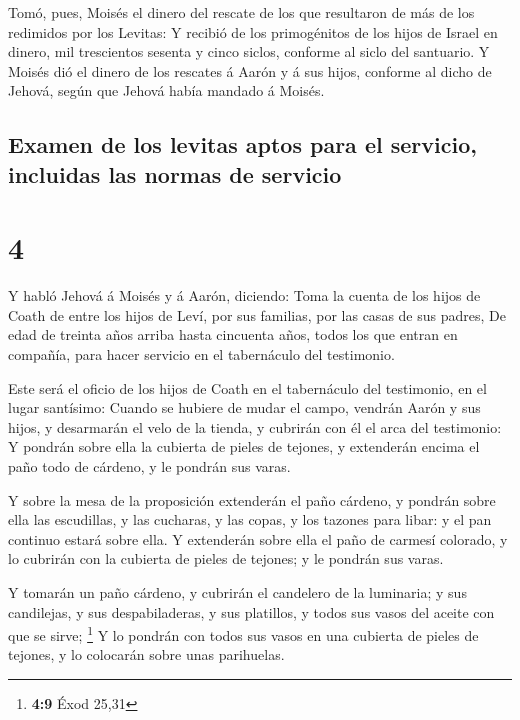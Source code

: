  Tomó, pues, Moisés el dinero del rescate de los que
resultaron de más de los redimidos por los Levitas:  Y
recibió de los primogénitos de los hijos de Israel en dinero, mil
trescientos sesenta y cinco siclos, conforme al siclo del santuario.
 Y Moisés dió el dinero de los rescates á Aarón y á sus
hijos, conforme al dicho de Jehová, según que Jehová había mandado á
Moisés.

\hypertarget{examen-de-los-levitas-aptos-para-el-servicio-incluidas-las-normas-de-servicio}{%
\subsection{Examen de los levitas aptos para el servicio, incluidas las
normas de
servicio}\label{examen-de-los-levitas-aptos-para-el-servicio-incluidas-las-normas-de-servicio}}

\hypertarget{section-3}{%
\section{4}\label{section-3}}

 Y habló Jehová á Moisés y á Aarón, diciendo:
 Toma la cuenta de los hijos de Coath de entre los hijos
de Leví, por sus familias, por las casas de sus padres, 
De edad de treinta años arriba hasta cincuenta años, todos los que
entran en compañía, para hacer servicio en el tabernáculo del
testimonio.

 Este será el oficio de los hijos de Coath en el
tabernáculo del testimonio, en el lugar santísimo:  Cuando
se hubiere de mudar el campo, vendrán Aarón y sus hijos, y desarmarán el
velo de la tienda, y cubrirán con él el arca del testimonio:
 Y pondrán sobre ella la cubierta de pieles de tejones, y
extenderán encima el paño todo de cárdeno, y le pondrán sus varas.

 Y sobre la mesa de la proposición extenderán el paño
cárdeno, y pondrán sobre ella las escudillas, y las cucharas, y las
copas, y los tazones para libar: y el pan continuo estará sobre ella.
 Y extenderán sobre ella el paño de carmesí colorado, y lo
cubrirán con la cubierta de pieles de tejones; y le pondrán sus varas.

 Y tomarán un paño cárdeno, y cubrirán el candelero de la
luminaria; y sus candilejas, y sus despabiladeras, y sus platillos, y
todos sus vasos del aceite con que se sirve; \footnote{\textbf{4:9} Éxod
  25,31}  Y lo pondrán con todos sus vasos en una
cubierta de pieles de tejones, y lo colocarán sobre unas parihuelas.

